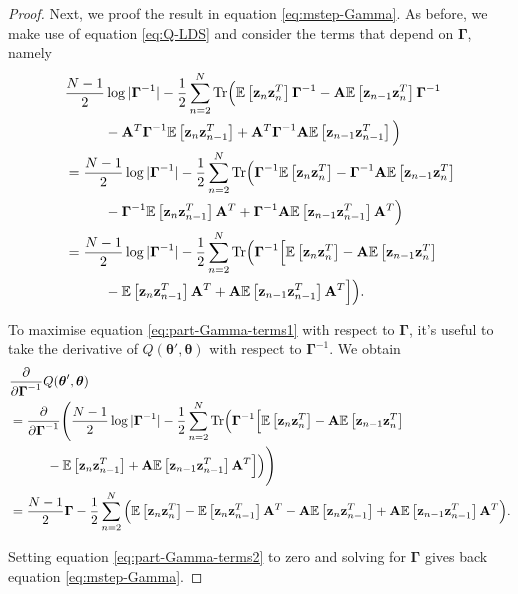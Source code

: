 \documentclass[11pt]{article}
\numberwithin{equation}{section}
\newcommand{\expectation}[1]{\mathbb{E}\left[#1\right]}
\newcommand{\z}{{\bf z}}
\begin{document}
\begin{proof}
	Next, we proof the result in equation \eqref{eq:mstep-Gamma}. As before, we make use of equation \eqref{eq:Q-LDS} and consider the terms that depend on $\boldsymbol{\Gamma}$, namely
	\begin{align}
		& \frac{N-1}{2}\log\vert\boldsymbol\Gamma^{-1}\vert -\frac{1}{2}\sum_{n=2}^N\text{Tr}\Big(\expectation{\z_n\z_n^T}\boldsymbol\Gamma^{-1} - {\bf A}\expectation{\z_{n-1}\z_n^T}\boldsymbol\Gamma^{-1} \nonumber\\
		&\hspace{1cm} - {\bf A}^T\boldsymbol{\Gamma}^{-1} \expectation{\z_n\z_{n-1}^T} + {\bf A}^T\boldsymbol\Gamma^{-1}{\bf A} \expectation{\z_{n-1}\z_{n-1}^T}\Big) \nonumber\\
		&= \frac{N-1}{2}\log\vert\boldsymbol\Gamma^{-1}\vert -\frac{1}{2}\sum_{n=2}^N\text{Tr}\Big( \boldsymbol{\Gamma}^{-1}\expectation{\z_n\z_n^T} - \boldsymbol{\Gamma}^{-1}{\bf A}\expectation{\z_{n-1}\z_n^T} \nonumber \\
		&\hspace{1cm} -\boldsymbol{\Gamma}^{-1}\expectation{\z_{n}\z_{n-1}^T}{\bf A}^T + \boldsymbol{\Gamma}^{-1} {\bf A}\expectation{\z_{n-1}\z_{n-1}^T}{\bf A}^T\Big) \nonumber\\
		&= \frac{N-1}{2}\log\vert\boldsymbol\Gamma^{-1}\vert -\frac{1}{2}\sum_{n=2}^N\text{Tr}\Big(\boldsymbol{\Gamma}^{-1}\Big[\expectation{\z_n\z_n^T} - {\bf A}\expectation{\z_{n-1}\z_n^T} \nonumber \\
		&\hspace{1cm} -\expectation{\z_n\z_{n-1}^T}{\bf A}^T + {\bf A}\expectation{\z_{n-1}\z_{n-1}^T}{\bf A}^T \Big]\Big) \label{eq:part-Gamma-terms1}.
	\end{align}
	
	To maximise equation \eqref{eq:part-Gamma-terms1} with respect to $\boldsymbol{\Gamma}$, it's useful to take the derivative of $Q(\boldsymbol\theta', \boldsymbol\theta)$ with respect to $\boldsymbol{\Gamma}^{-1}$. We obtain
	\begin{align}
		&\frac{\partial}{\partial \boldsymbol{\Gamma}^{-1}}Q(\boldsymbol\theta', \boldsymbol\theta) \\
		&= \frac{\partial}{\partial \boldsymbol{\Gamma}^{-1}}\Bigg(\frac{N-1}{2}\log\vert\boldsymbol\Gamma^{-1}\vert -\frac{1}{2}\sum_{n=2}^N\text{Tr}\Big(\boldsymbol{\Gamma}^{-1}\Big[\expectation{\z_n\z_n^T} - {\bf A}\expectation{\z_{n-1}\z_n^T} \nonumber \\
		&\hspace{1cm} -\expectation{\z_n\z_{n-1}^T} + {\bf A}\expectation{\z_{n-1}\z_{n-1}^T}{\bf A}^T \Big]\Big)\Bigg) \\
		&= \frac{N-1}{2}\boldsymbol\Gamma -\frac{1}{2}\sum_{n=2}^N\Big(\expectation{\z_n\z_n^T} - \expectation{\z_n\z_{n-1}^T}{\bf A}^T  - {\bf A}\expectation{\z_n\z_{n-1}^T} + {\bf A}\expectation{\z_{n-1}\z_{n-1}^T}{\bf A}^T\Big). \label{eq:part-Gamma-terms2}
	\end{align}
	
	Setting equation \eqref{eq:part-Gamma-terms2} to zero and solving for $\boldsymbol{\Gamma}$ gives back equation \eqref{eq:mstep-Gamma}.
\end{proof}
\end{document}
